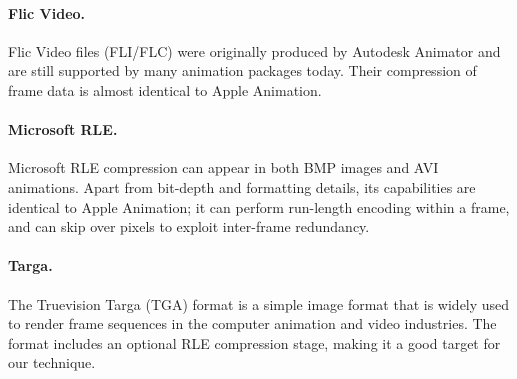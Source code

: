 \paragraph{Flic Video.}
Flic Video files (FLI/FLC) were originally produced by Autodesk
Animator and are still supported by many animation packages today.
Their compression of frame data is almost identical to Apple
Animation.

\paragraph{Microsoft RLE.}
Microsoft RLE compression can appear in both BMP images and AVI
animations.  Apart from bit-depth and formatting details, its
capabilities are identical to Apple Animation; it can perform
run-length encoding within a frame, and can skip over pixels to
exploit inter-frame redundancy.

\paragraph{Targa.}
The Truevision Targa (TGA) format is a simple image format that is
widely used to render frame sequences in the computer animation and
video industries.  The format includes an optional RLE compression
stage, making it a good target for our technique.





